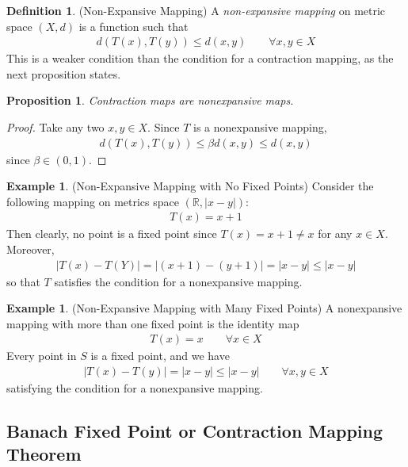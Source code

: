 \documentclass[12pt]{book}
\numberwithin{equation}{section} %
\theoremstyle{plain}
\newtheorem{prop}[thm]{Proposition}
\theoremstyle{definition}
\newtheorem{defn}[thm]{Definition}
\newtheorem{ex}[thm]{Example}
\theoremstyle{remark}
\newcommand{\R}{\mathbb{R}}
\begin{document}
\begin{defn}(Non-Expansive Mapping)
A \emph{non-expansive mapping} on metric space $(X,d)$ is a function
such that
\begin{align*}
  d(T(x),T(y)) \leq d(x,y)
  \qquad\forall x,y\in X
\end{align*}
This is a weaker condition than the condition for a contraction mapping,
as the next proposition states.
\end{defn}

\begin{prop}
Contraction maps are nonexpansive maps.
\end{prop}
\begin{proof}
Take any two $x,y\in X$. Since $T$ is a nonexpansive mapping,
\begin{align*}
  d(T(x),T(y)) \leq \beta d(x,y) \leq d(x,y)
\end{align*}
since $\beta \in (0,1)$.
\end{proof}

\begin{ex}(Non-Expansive Mapping with No Fixed Points)
Consider the following mapping on metrics space $(\R,|x-y|)$:
\begin{align*}
  T(x) = x+1
\end{align*}
Then clearly, no point is a fixed point since $T(x)=x+1\neq x$
for any $x\in X$. Moreover,
\begin{align*}
  |T(x)-T(Y)| = |(x+1)-(y+1)| = |x-y|\leq |x-y|
\end{align*}
so that $T$ satisfies the condition for a nonexpansive mapping.
\end{ex}

\begin{ex}(Non-Expansive Mapping with Many Fixed Points)
A nonexpansive mapping with more than one fixed point is the
identity map
\begin{align*}
  T(x) = x
  \qquad \forall x\in X
\end{align*}
Every point in $S$ is a fixed point, and we have
\begin{align*}
  |T(x)-T(y)| = |x-y| \leq |x-y|
  \qquad\forall x,y\in X
\end{align*}
satisfying the condition for a nonexpansive mapping.
\end{ex}

\clearpage
\subsection{Banach Fixed Point or Contraction Mapping Theorem}
\end{document}
